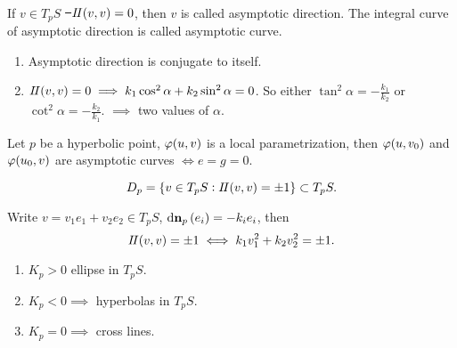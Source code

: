 \begin{definition}\hfill\\
    If \(v\in T_p S\) \st\ \(I\!I(v,v)=0\), then \(v\) is called asymptotic
    direction. The integral curve of asymptotic direction is called asymptotic
    curve.
\end{definition}
\begin{remark}
\begin{enumerate}[(1)]
    \item Asymptotic direction is conjugate to itself.
    \item \(I\!I(v,v)=0\implies k_1\cos^2\alpha+k_2\sin^2\alpha=0\). So either
        \(\tan^2\alpha=-\frac{k_1}{k_2}\) or \(\cot^2\alpha=-\frac{k_2}{k_1}\).
        \(\implies \) two values of \(\alpha\).
\end{enumerate}
\end{remark}

\begin{exercise}
    Let \(p\) be a hyperbolic point, \(\varphi(u,v)\) is a local parametrization,
    then \(\varphi(u,v_0)\) and \(\varphi(u_0,v)\) are asymptotic curves 
    \(\iff e=g=0\).
\end{exercise}

\begin{definition}
    \[
        D_p=\{v\in T_p S:I\!I(v,v)=\pm 1\}\subset T_p S
    .\] 
\end{definition}
\begin{remark}
    Write \(v=v_1e_1+v_2e_2\in T_p S\), \(\dd{\vb{n}}_p(e_i)=-k_ie_i\), then \[
        I\!I(v,v)=\pm 1\iff k_1v_1^2+k_2v_2^2=\pm 1
    .\] 
    \begin{enumerate}[(1)]
        \item \(K_p>0\) ellipse in \(T_p S\).
        \item \(K_p<0\implies \) hyperbolas in \(T_p S\).
        \item \(K_p=0\implies \) cross lines.
    \end{enumerate}
\end{remark}

\newpage
